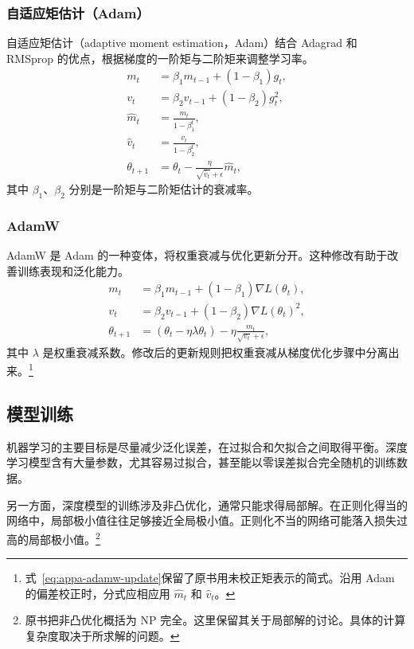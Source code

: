 \subsubsection{自适应矩估计（Adam）}
自适应矩估计（adaptive moment estimation，Adam）结合 Adagrad 和 RMSprop 的优点，根据梯度的一阶矩与二阶矩来调整学习率。
\begin{align}
m_t&=\beta_1m_{t-1}+(1-\beta_1)g_t,
\label{eq:appa-adam-first-moment}\\
v_t&=\beta_2v_{t-1}+(1-\beta_2)g_t^2,
\label{eq:appa-adam-second-moment}\\
\hat{m}_t&=\frac{m_t}{1-\beta_1^t},
\label{eq:appa-adam-corrected-first}\\
\hat{v}_t&=\frac{v_t}{1-\beta_2^t},
\label{eq:appa-adam-corrected-second}\\
\theta_{t+1}&=\theta_t-\frac{\eta}{\sqrt{\hat{v}_t}+\epsilon}\hat{m}_t,
\label{eq:appa-adam-update}
\end{align}
其中 $\beta_1$、$\beta_2$ 分别是一阶矩与二阶矩估计的衰减率。

\subsubsection{AdamW}
AdamW 是 Adam 的一种变体，将权重衰减与优化更新分开。这种修改有助于改善训练表现和泛化能力。
\begin{align}
m_t&=\beta_1m_{t-1}+(1-\beta_1)\nabla L(\theta_t),
\label{eq:appa-adamw-first-moment}\\
v_t&=\beta_2v_{t-1}+(1-\beta_2)\nabla L(\theta_t)^2,
\label{eq:appa-adamw-second-moment}\\
\theta_{t+1}&=(\theta_t-\eta\lambda\theta_t)-
\eta\frac{m_t}{\sqrt{v_t}+\epsilon},
\label{eq:appa-adamw-update}
\end{align}
其中 $\lambda$ 是权重衰减系数。修改后的更新规则把权重衰减从梯度优化步骤中分离出来。\footnote{式~\eqref{eq:appa-adamw-update}保留了原书用未校正矩表示的简式。沿用 Adam 的偏差校正时，分式应相应用 $\hat{m}_t$ 和 $\hat{v}_t$。}

\subsection{模型训练}
机器学习的主要目标是尽量减少泛化误差，在过拟合和欠拟合之间取得平衡。深度学习模型含有大量参数，尤其容易过拟合，甚至能以零误差拟合完全随机的训练数据。

另一方面，深度模型的训练涉及非凸优化，通常只能求得局部解。在正则化得当的网络中，局部极小值往往足够接近全局极小值。正则化不当的网络可能落入损失过高的局部极小值。\footnote{原书把非凸优化概括为 NP 完全。这里保留其关于局部解的讨论。具体的计算复杂度取决于所求解的问题。}

